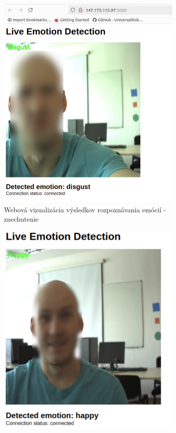 \begin{figure}[!htpb]
    \centering
    \begin{subfigure}{0.48\textwidth}
        \includegraphics[width=\textwidth]{img/web_1.png}
        \caption{Webová vizualizácia výsledkov rozpoznávania emócií - znechutenie}
    \end{subfigure}
    \hfill
    \begin{subfigure}{0.48\textwidth}
        \includegraphics[width=\textwidth]{img/web_2.png}

\end{subfigure}
\end{figure}

